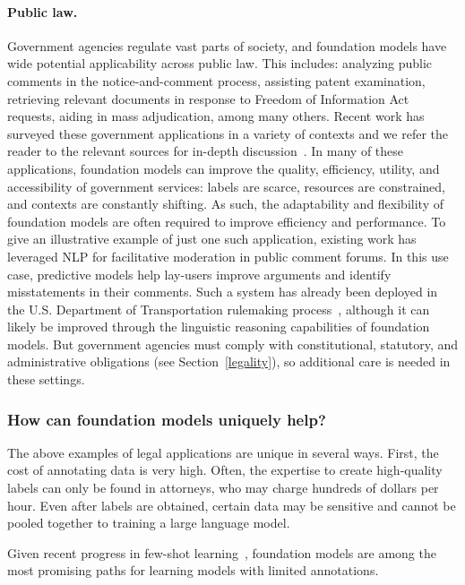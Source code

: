 \paragraph{Public law.} Government agencies regulate vast parts of society, and foundation models have wide potential applicability across public law. This includes: analyzing public comments in the notice-and-comment process, assisting  patent examination, retrieving relevant documents in response to Freedom of Information Act requests, aiding in mass adjudication, among many others. Recent work has surveyed these government applications in a variety of contexts and we refer the reader to the relevant sources for in-depth discussion~\citep{engstrom2020government,coglianese2020ai}. In many of these applications, foundation models can improve the quality, efficiency, utility, and accessibility of government services: labels are scarce, resources are constrained, and contexts are constantly shifting. As such, the adaptability and flexibility of foundation models are often required to improve efficiency and performance. To give an illustrative example of just one such application, existing work has leveraged NLP for facilitative moderation in public comment forums. In this use case, predictive models help lay-users improve arguments and identify misstatements in their comments. Such a system has already been deployed in the U.S. Department of Transportation rulemaking process~\citep{park2012facilitative}, although it can likely be improved through the linguistic reasoning capabilities of foundation models. But government agencies must comply with constitutional, statutory, and administrative obligations (see Section~\ref{legality}), so additional care is needed in these settings. 

\subsubsection{How can foundation models uniquely help?}

The above examples of legal applications are unique in several ways. First, the cost of annotating data is very high. Often, the expertise to create high-quality labels can only be found in attorneys, who may charge hundreds of dollars per hour. Even after labels are obtained, certain data may be sensitive and cannot be pooled together to training a large language model.

Given recent progress in few-shot learning~\citep{brown2020gpt3}, foundation models are among the most promising paths for learning models with limited annotations.

